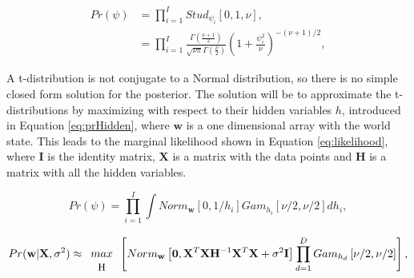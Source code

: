 \documentclass[12pt]{article}
\begin{document}
\begin{align}
\label{eq:prior}
Pr(\psi) &= \prod_{i = 1}^{I} Stud_{\psi_i} [0, 1, \nu],\\
&= \prod_{i=1}^I \frac{\Gamma \left( \frac{\nu + 1}{2} \right)}{ \sqrt{\nu \pi} \Gamma \left(\frac{\nu}{2} \right) } \left( 1 + \frac{\psi^2_i}{\nu} \right)^{- (\nu+1)/2},
\end{align}

A t-distribution is not conjugate to a Normal distribution, so there is no simple closed form solution for the posterior.
The solution will be to approximate the t-distributions by maximizing with respect to their hidden variables $h$, introduced in Equation \ref{eq:prHidden}, where $\mathbf{w}$ is a one dimensional array with the world state.
This leads to the marginal likelihood shown in Equation \ref{eq:likelihood}, where $\mathbf{I}$ is the identity matrix, $\mathbf{X}$ is a matrix with the data points and $\mathbf{H}$ is a matrix with all the hidden variables.

\begin{equation}
\label{eq:prHidden}
Pr(\psi) = \prod_{i = 1}^{I} \int Norm_{\mathbf{w}}[0,1/h_i] Gam_{h_i}[\nu/2, \nu/2] dh_i,
\end{equation}

\begin{equation}
\label{eq:likelihood}
Pr(\mathbf{w}|\mathbf{X},\sigma^2) \approx \begin{array}{c}
		\\
      max \\
      \mathbf{ \mbox{\small H} }
    \end{array} \left[ Norm_{\mathbf{w}} \left[ \mathbf{0}, \mathbf{X}^T \mathbf{X} \mathbf{H}^{-1} \mathbf{X}^T \mathbf{X} + \sigma^2 \mathbf{I} \right] \prod_{d =1}^D Gam_{h_d} \left[ \nu /2, \nu/2 \right]  \right],
\end{equation}
\end{document}
